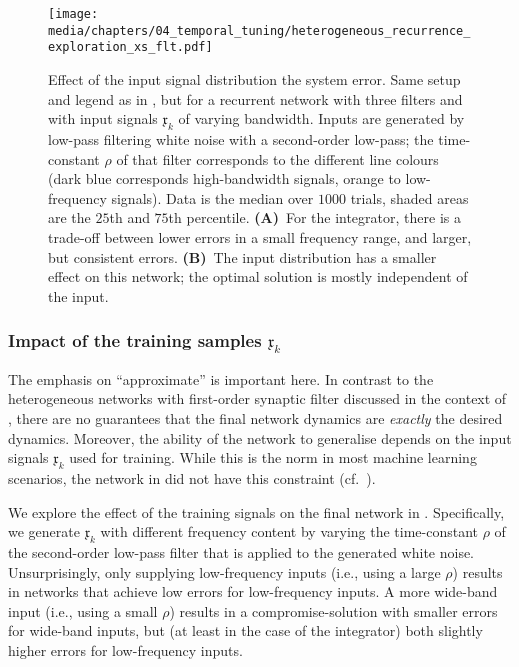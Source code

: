 \begin{figure}
	\centering
	\texttt{[image: media/chapters/04\_temporal\_tuning/heterogeneous\_recurrence\_exploration\_xs\_flt.pdf]}
	\caption[Effect of the input signal distribution the system error]{Effect of the input signal distribution the system error.
	Same setup and legend as in , but for a recurrent network with three filters and with input signals $\mathfrak{x}_k$ of varying bandwidth.
	Inputs are generated by low-pass filtering white noise with a second-order low-pass; the time-constant $\rho$ of that filter corresponds to the different line colours (dark blue corresponds high-bandwidth signals, orange to low-frequency signals).
	Data is the median over $1000$ trials, shaded areas are the $25$th and $75$th percentile.
	\textbf{(A)}~For the integrator, there is a trade-off between lower errors in a small frequency range, and larger, but consistent errors.
	\textbf{(B)}~The input distribution has a smaller effect on this network; the optimal solution is mostly independent of the input.
	}
	\label{fig:heterogeneous_recurrence_exploration_xs_flt}
\end{figure}

\subsubsection{Impact of the training samples $\mathfrak{x}_k$}
The emphasis on \enquote{approximate} is important here.
In contrast to the heterogeneous networks with first-order synaptic filter discussed in the context of , there are no guarantees that the final network dynamics are \emph{exactly} the desired dynamics.
Moreover, the ability of the network to generalise depends on the input signals $\mathfrak{x}_k$ used for training.
While this is the norm in most machine learning scenarios, the network in  did not have this constraint (cf.~).

We explore the effect of the training signals on the final network in .
Specifically, we generate $\mathfrak{x}_k$ with different frequency content by varying the time-constant $\rho$ of the second-order low-pass filter that is applied to the generated white noise.
Unsurprisingly, only supplying low-frequency inputs (i.e., using a large $\rho$) results in networks that achieve low errors for low-frequency inputs.
A more wide-band input (i.e., using a small $\rho$) results in a compromise-solution with smaller errors for wide-band inputs, but (at least in the case of the integrator) both slightly higher errors for low-frequency inputs.

